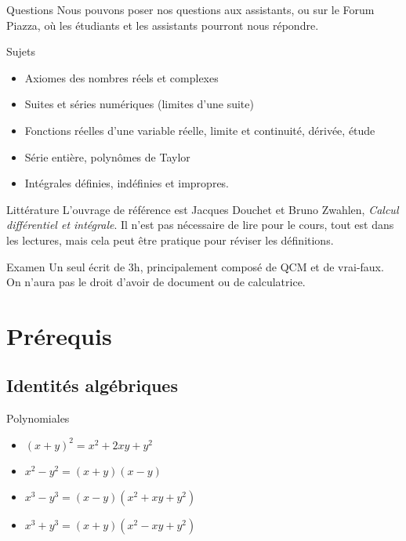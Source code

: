 \documentclass{article}
\begin{document}
\begin{parag}{Questions}
    Nous pouvons poser nos questions aux assistants, ou sur le Forum Piazza, où les étudiants et les assistants pourront nous répondre.
\end{parag}

\begin{parag}{Sujets}
    \begin{itemize}[left=0pt]
        \item Axiomes des nombres réels et complexes
        \item Suites et séries numériques (limites d'une suite)
        \item Fonctions réelles d'une variable réelle, limite et continuité, dérivée, étude
        \item Série entière, polynômes de Taylor
        \item Intégrales définies, indéfinies et impropres.
    \end{itemize}
\end{parag}

\begin{parag}{Littérature}
    L'ouvrage de référence est Jacques Douchet et Bruno Zwahlen, \textit{Calcul différentiel et intégrale}. Il n'est pas nécessaire de lire pour le cours, tout est dans les lectures, mais cela peut être pratique pour réviser les définitions.
\end{parag}

\begin{parag}{Examen}
    Un seul écrit de 3h, principalement composé de QCM et de vrai-faux. On n'aura pas le droit d'avoir de document ou de calculatrice.
\end{parag}

\section{Prérequis}
\subsection{Identités algébriques}
\begin{parag}{Polynomiales}
    \begin{itemize}[left=0pt]
        \item $\left(x + y\right)^2 = x^2 + 2xy + y^2$
        \item $x^2 - y^2 = (x + y)(x - y)$
        \item $x^3 - y^3 = (x - y)(x^2 + xy + y^2)$
        \item $x^3 + y^3 = \left(x + y\right)\left(x^2 -xy + y^2\right)$
    \end{itemize}
 
\end{parag}
\end{document}
